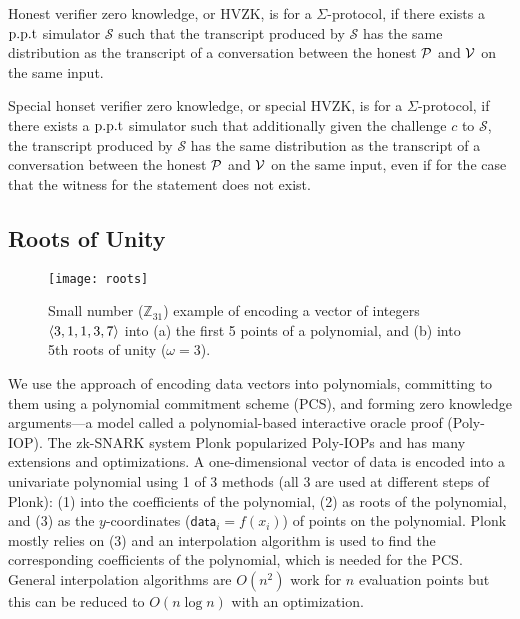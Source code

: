 \begin{definition}
Honest verifier zero knowledge, or HVZK, is for a $\Sigma$-protocol, if there exists a $\text{p.p.t}$ simulator $\mathcal{S}$ such that the transcript produced by $\mathcal{S}$ has the same distribution as the transcript of a conversation between the honest $\mathcal{P}$ and $\mathcal{V}$ on the same input.
\end{definition}

\begin{definition}
Special honset verifier zero knowledge, or special HVZK, is for a $\Sigma$-protocol, if there exists a $\text{p.p.t}$ simulator such that additionally given the challenge $c$ to $\mathcal{S}$, the transcript produced by $\mathcal{S}$ has the same distribution as the transcript of a conversation between the honest $\mathcal{P}$ and $\mathcal{V}$ on the same input, even if for the case that the witness for the statement does not exist.
\end{definition}

\subsection{Roots of Unity}
\label{app:rou}

\begin{figure}
\centering
\texttt{[image: roots]}
\caption{Small number ($\mathbb{Z}_{31}$) example of encoding a vector of integers $\left \langle 3,1,1,3,7 \right \rangle$ into (a) the first 5 points of a polynomial, and (b) into 5th roots of unity ($\omega=3$).\label{fig:rou}}
\end{figure}

We use the approach of encoding data vectors into polynomials, committing to them using a polynomial commitment scheme (PCS), and forming zero knowledge arguments---a model called a polynomial-based interactive oracle proof (Poly-IOP). The zk-SNARK system Plonk popularized Poly-IOPs and has many extensions and optimizations. A one-dimensional vector of data is encoded into a univariate polynomial using 1 of 3 methods (all 3 are used at different steps of Plonk): (1) into the coefficients of the polynomial, (2) as roots of the polynomial, and (3) as the \(y\)-coordinates (\(\mathsf{data}_i=f(x_i)\)) of points on the polynomial. Plonk mostly relies on (3) and an interpolation algorithm is used to find the corresponding coefficients of the polynomial, which is
needed for the PCS. General interpolation algorithms are \(O(n^2)\) work for \(n\) evaluation points but this can be reduced to \(O(n\log n)\) with an optimization.

